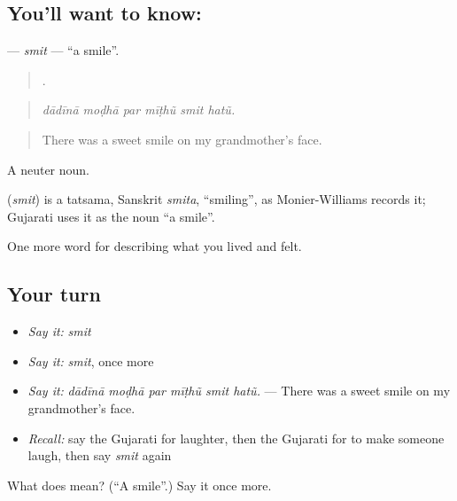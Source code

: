 \subsection*{You'll want to know: }
\textbf{} — \emph{smit} — \textquotedblleft{}a smile\textquotedblright{}.

\begin{quote}
     .
\end{quote}

\begin{quote}
\emph{dādīnā moḍhā par mīṭhũ smit hatũ.}
\end{quote}

\begin{quote}
There was a sweet smile on my grandmother's face.
\end{quote}

A neuter noun.

\begin{cousinweb}
\textbf{} (\emph{smit}) is a tatsama, Sanskrit \emph{smita}, \textquotedblleft{}smiling\textquotedblright{}, as Monier-Williams records it; Gujarati uses it as the noun \textquotedblleft{}a smile\textquotedblright{}.
\end{cousinweb}

\begin{grammarlens}[title={What you've built}]
One more word for describing what you lived and felt.
\end{grammarlens}

\subsection*{Your turn}
\begin{itemize}
\raggedright
  \item \emph{Say it:} \emph{smit}
  \item \emph{Say it:} \emph{smit}, once more
  \item \emph{Say it:} \emph{dādīnā moḍhā par mīṭhũ smit hatũ.} — There was a sweet smile on my grandmother's face.
  \item \emph{Recall:} say the Gujarati for laughter, then the Gujarati for to make someone laugh, then say \emph{smit} again
\end{itemize}

\begin{tcolorbox}[breakable,colback=teal!4,colframe=teal!35!black,title={Before you move on}]
What does  mean? (\textquotedblleft{}A smile\textquotedblright{}.) Say it once more.
\end{tcolorbox}
